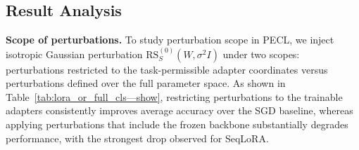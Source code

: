 \documentclass{article}
\theoremstyle{plain}
\theoremstyle{definition}
\theoremstyle{remark}
\begin{document}
\subsection{Result Analysis}





\noindent\textbf{Scope of perturbations.}\quad
To study perturbation scope in PECL, we inject isotropic Gaussian perturbation $\mathrm{RS}_S^{(0)}({W}, \sigma^2 
I)$ under two scopes: perturbations restricted to the task-permissible adapter coordinates versus perturbations defined over the full parameter space.
As shown in Table~\ref{tab:lora_or_full_cls—show}, restricting perturbations to the trainable adapters consistently improves average accuracy over the SGD baseline, whereas applying perturbations that include the frozen backbone substantially degrades performance, with the strongest drop observed for SeqLoRA.



\end{document}
